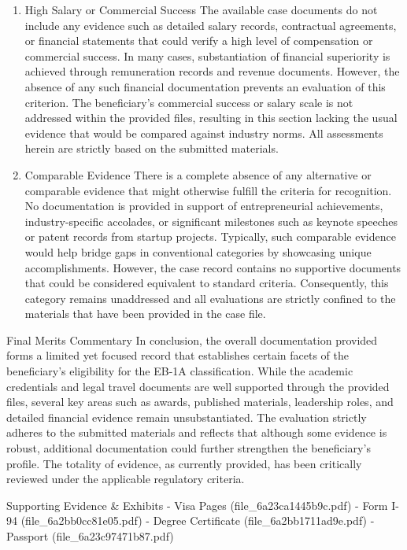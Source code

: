 \begin{enumerate}
\item High Salary or Commercial Success
The available case documents do not include any evidence such as detailed salary records, contractual agreements, or financial statements that could verify a high level of compensation or commercial success. In many cases, substantiation of financial superiority is achieved through remuneration records and revenue documents. However, the absence of any such financial documentation prevents an evaluation of this criterion. The beneficiary’s commercial success or salary scale is not addressed within the provided files, resulting in this section lacking the usual evidence that would be compared against industry norms. All assessments herein are strictly based on the submitted materials.

\item Comparable Evidence
There is a complete absence of any alternative or comparable evidence that might otherwise fulfill the criteria for recognition. No documentation is provided in support of entrepreneurial achievements, industry-specific accolades, or significant milestones such as keynote speeches or patent records from startup projects. Typically, such comparable evidence would help bridge gaps in conventional categories by showcasing unique accomplishments. However, the case record contains no supportive documents that could be considered equivalent to standard criteria. Consequently, this category remains unaddressed and all evaluations are strictly confined to the materials that have been provided in the case file.

\end{enumerate}

Final Merits Commentary
In conclusion, the overall documentation provided forms a limited yet focused record that establishes certain facets of the beneficiary’s eligibility for the EB-1A classification. While the academic credentials and legal travel documents are well supported through the provided files, several key areas such as awards, published materials, leadership roles, and detailed financial evidence remain unsubstantiated. The evaluation strictly adheres to the submitted materials and reflects that although some evidence is robust, additional documentation could further strengthen the beneficiary’s profile. The totality of evidence, as currently provided, has been critically reviewed under the applicable regulatory criteria.

Supporting Evidence \& Exhibits
- Visa Pages (file\_6a23ca1445b9c.pdf)
- Form I-94 (file\_6a2bb0cc81e05.pdf)
- Degree Certificate (file\_6a2bb1711ad9e.pdf)
- Passport (file\_6a23c97471b87.pdf)